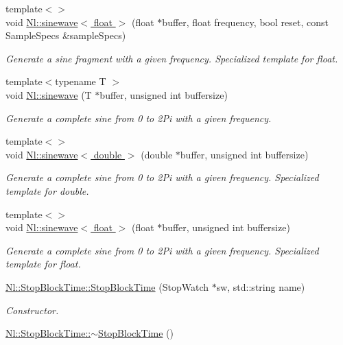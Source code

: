 \begin{DoxyCompactItemize}
{\footnotesize template$<$$>$ }\\void \hyperlink{group__Tools_ga02e84b7f11f7f56667f46b20ed8c8fd2}{Nl\-::sinewave$<$ float $>$} (float $\ast$buffer, float frequency, bool reset, const Sample\-Specs \&sample\-Specs)
\begin{DoxyCompactList}\small\item\em Generate a sine fragment with a given frequency. Specialized template for float. \end{DoxyCompactList}\item 
{\footnotesize template$<$typename T $>$ }\\void \hyperlink{group__Tools_gaaa8044cd5d7fb8a546c89a8a734a9b84}{Nl\-::sinewave} (T $\ast$buffer, unsigned int buffersize)
\begin{DoxyCompactList}\small\item\em Generate a complete sine from 0 to 2\-Pi with a given frequency. \end{DoxyCompactList}\item 
{\footnotesize template$<$$>$ }\\void \hyperlink{group__Tools_gae9f833f46f694578df96c59cdc77b05c}{Nl\-::sinewave$<$ double $>$} (double $\ast$buffer, unsigned int buffersize)
\begin{DoxyCompactList}\small\item\em Generate a complete sine from 0 to 2\-Pi with a given frequency. Specialized template for double. \end{DoxyCompactList}\item 
{\footnotesize template$<$$>$ }\\void \hyperlink{group__Tools_gaccbed8278ac6853901b118e5e64b2fa1}{Nl\-::sinewave$<$ float $>$} (float $\ast$buffer, unsigned int buffersize)
\begin{DoxyCompactList}\small\item\em Generate a complete sine from 0 to 2\-Pi with a given frequency. Specialized template for float. \end{DoxyCompactList}\item 
\hyperlink{group__Tools_ga33325d365bbddda3814093ca7e362474}{Nl\-::\-Stop\-Block\-Time\-::\-Stop\-Block\-Time} (Stop\-Watch $\ast$sw, std\-::string name)
\begin{DoxyCompactList}\small\item\em Constructor. \end{DoxyCompactList}\item 
\hyperlink{group__Tools_ga6b16ead71407ac4cc14b293e46bfbc3a}{Nl\-::\-Stop\-Block\-Time\-::$\sim$\-Stop\-Block\-Time} ()

\end{DoxyCompactItemize}
